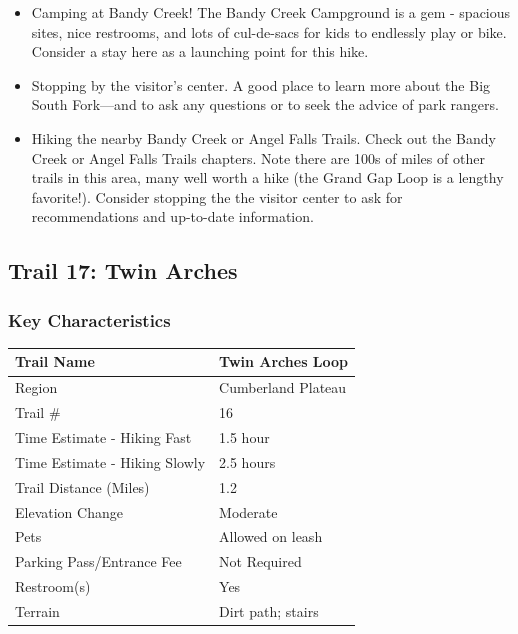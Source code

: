 \documentclass[
  letterpaper,
  DIV=11,
  numbers=noendperiod]{scrartcl}
\providecommand{\tightlist}{%
  \setlength{\itemsep}{0pt}\setlength{\parskip}{0pt}}\usepackage{longtable,booktabs,array}
\begin{document}
\begin{itemize}
\tightlist
\item
  Camping at Bandy Creek! The Bandy Creek Campground is a gem - spacious
  sites, nice restrooms, and lots of cul-de-sacs for kids to endlessly
  play or bike. Consider a stay here as a launching point for this hike.
\item
  Stopping by the visitor's center. A good place to learn more about the
  Big South Fork---and to ask any questions or to seek the advice of
  park rangers.
\item
  Hiking the nearby Bandy Creek or Angel Falls Trails. Check out the
  Bandy Creek or Angel Falls Trails chapters. Note there are 100s of
  miles of other trails in this area, many well worth a hike (the Grand
  Gap Loop is a lengthy favorite!). Consider stopping the the visitor
  center to ask for recommendations and up-to-date information.
\end{itemize}

\hypertarget{trail-17-twin-arches}{%
\subsection{Trail 17: Twin Arches}\label{trail-17-twin-arches}}

\hypertarget{key-characteristics-16}{%
\subsubsection{Key Characteristics}\label{key-characteristics-16}}

\begin{longtable}[]{@{}ll@{}}
\toprule\noalign{}
Trail Name & Twin Arches Loop \\
\midrule\noalign{}
\endhead
\bottomrule\noalign{}
\endlastfoot
Region & Cumberland Plateau \\
Trail \# & 16 \\
Time Estimate - Hiking Fast & 1.5 hour \\
Time Estimate - Hiking Slowly & 2.5 hours \\
Trail Distance (Miles) & 1.2 \\
Elevation Change & Moderate \\
Pets & Allowed on leash \\
Parking Pass/Entrance Fee & Not Required \\
Restroom(s) & Yes \\
Terrain & Dirt path; stairs \\
\end{longtable}
\end{document}
